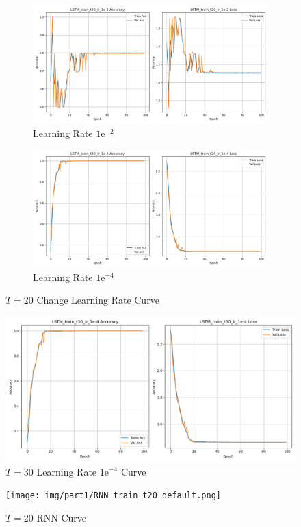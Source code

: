 \documentclass{article}
\begin{document}
\begin{appendix}
\begin{figure}[!htbp]
  \centering
  \begin{subfigure}[b]{1\textwidth}
    \includegraphics[width=\textwidth]{img/part1/LSTM_train_t20_lr_1e-2.png}
    \caption{Learning Rate $1\mathrm{e}^{-2}$}
  \end{subfigure}
  \begin{subfigure}[b]{1\textwidth}
    \includegraphics[width=\textwidth]{img/part1/LSTM_train_t20_lr_1e-4.png}
    \caption{Learning Rate $1\mathrm{e}^{-4}$}
  \end{subfigure}
  \caption{$T = 20$ Change Learning Rate Curve}
  \label{fig:p1_t20_lr_change}
\end{figure}

\begin{figure}[!htbp]
    \centering
    \includegraphics[width=1\textwidth]{img/part1/LSTM_train_t30_lr_1e-4.png}
    \caption{$T = 30$ Learning Rate $1\mathrm{e}^{-4}$ Curve}
    \label{fig:p1_t30}
\end{figure}

\begin{figure}[!htbp]
    \centering
    \texttt{[image: img/part1/RNN\_train\_t20\_default.png]}
    \caption{$T = 20$ RNN Curve}
    \label{fig:p1_t20_rnn}
\end{figure}

\end{appendix}
\end{document}
